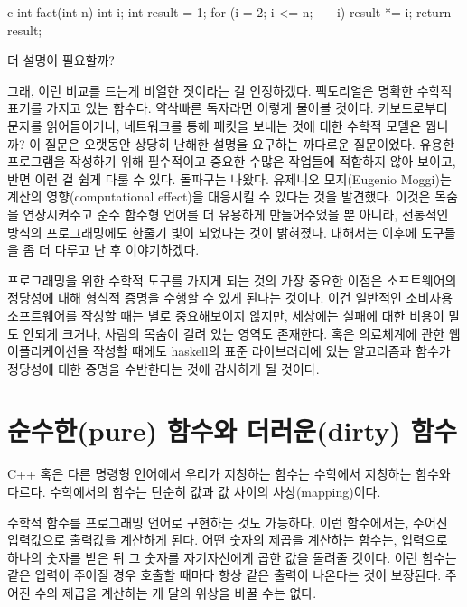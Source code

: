 \begin{snip}{c}
int fact(int n) {
    int i;
    int result = 1;
    for (i = 2; i <= n; ++i)
        result *= i;
    return result;
}
\end{snip}

더 설명이 필요할까?

그래, 이런 비교를 드는게 비열한 짓이라는 걸 인정하겠다. 팩토리얼은 명확한 수학적 표기를 가지고 있는 함수다. 약삭빠른 독자라면 이렇게 물어볼 것이다.
키보드로부터 문자를 읽어들이거나, 네트워크를 통해 패킷을 보내는 것에 대한 수학적 모델은 뭡니까? 이 질문은 오랫동안 상당히 난해한 설명을 요구하는 까다로운 질문이었다.
\trDenotationalSemantics\는 유용한 프로그램을 작성하기 위해 필수적이고 중요한 수많은 작업들에 적합하지 않아 보이고, 반면 \trOperationalSemantics\는 이런 걸 쉽게 다룰 수 있다.
돌파구는  나왔다. 유제니오 모지(Eugenio Moggi)는 계산의 영향(computational effect)을  대응시킬 수 있다는 것을 발견했다.
이것은  목숨을 연장시켜주고 순수 함수형 언어를 더 유용하게 만들어주었을 뿐 아니라, 전통적인 방식의 프로그래밍에도 한줄기 빛이 되었다는 것이 밝혀졌다.
 대해서는 이후에  도구들을 좀 더 다루고 난 후 이야기하겠다.

프로그래밍을 위한 수학적 도구를 가지게 되는 것의 가장 중요한 이점은 소프트웨어의 정당성에 대해 형식적 증명을 수행할 수 있게 된다는 것이다.
이건 일반적인 소비자용 소프트웨어를 작성할 때는 별로 중요해보이지 않지만, 세상에는 실패에 대한 비용이 말도 안되게 크거나, 사람의 목숨이 걸려 있는 영역도 존재한다.
혹은 의료체계에 관한 웹 어플리케이션을 작성할 때에도 haskell의 표준 라이브러리에 있는 알고리즘과 함수가 정당성에 대한 증명을 수반한다는 것에 감사하게 될 것이다.

\section{순수한(pure) 함수와 더러운(dirty) 함수}

C++ 혹은 다른 명령형 언어에서 우리가 지칭하는 함수는 수학에서 지칭하는 함수와 다르다. 수학에서의 함수는 단순히 값과 값 사이의 사상(mapping)이다.

수학적 함수를 프로그래밍 언어로 구현하는 것도 가능하다. 이런 함수에서는, 주어진 입력값으로 출력값을 계산하게 된다.
어떤 숫자의 제곱을 계산하는 함수는, 입력으로 하나의 숫자를 받은 뒤 그 숫자를 자기자신에게 곱한 값을 돌려줄 것이다.
이런 함수는 같은 입력이 주어질 경우 호출할 때마다 항상 같은 출력이 나온다는 것이 보장된다.
주어진 수의 제곱을 계산하는 게 달의 위상을 바꿀 수는 없다.

